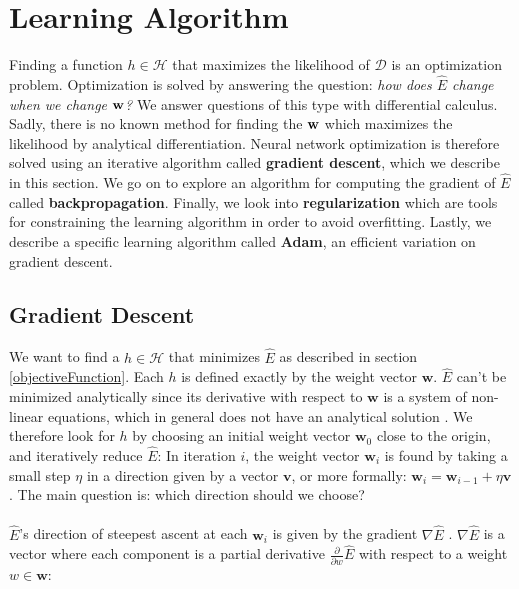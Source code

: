 \section{Learning Algorithm}
\label{learningAlgorithm}
Finding a function $h \in \mathcal{H}$ that maximizes the likelihood of $\mathcal{D}$ is an optimization problem. Optimization is solved by answering the question: \textit{how does $\hat{E}$ change when we change $\mathbf{w}$?} We answer questions of this type with differential calculus. Sadly, there is no known method for finding the $\mathbf{w}$ which maximizes the likelihood by analytical differentiation. Neural network optimization is therefore solved using an iterative algorithm called \textbf{gradient descent}, which we describe in this section. We go on to explore an algorithm for computing the gradient of $\hat{E}$ called \textbf{backpropagation}. Finally, we look into \textbf{regularization} which are tools for constraining the learning algorithm in order to avoid overfitting. Lastly, we describe a specific learning algorithm called \textbf{Adam}, an efficient variation on gradient descent.

\subsection{Gradient Descent}
\label{gradient_descent}
We want to find a $h \in \mathcal{H}$ that minimizes $\hat{E}$ as described in section \ref{objectiveFunction}. Each $h$ is defined exactly by the weight vector $\mathbf{w}$. $\hat{E}$ can't be minimized analytically since its derivative with respect to $\mathbf{w}$ is a system of non-linear equations, which in general does not have an analytical solution \citep{goodfellow16}. We therefore look for $h$ by choosing an initial weight vector $\mathbf{w}_0$ close to the origin, and iteratively reduce $\hat{E}$: In iteration $i$, the weight vector $\mathbf{w}_i$ is found by taking a small step $\eta$ in a direction given by a vector $\mathbf{v}$, or more formally: $\mathbf{w}_i = \mathbf{w}_{i-1} + \eta\mathbf{v}$. The main question is: which direction should we choose? 
\\\\ 
$\hat{E}$'s direction of steepest ascent at each $\mathbf{w}_i$ is given by the gradient $\nabla\hat{E}$ \citep{yaser12}. $\nabla \hat{E}$ is a vector where each component is a partial derivative $\frac{\partial}{\partial w}\hat{E}$ with respect to a weight $w \in \mathbf{w}$:

